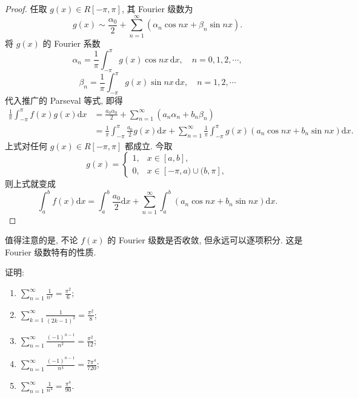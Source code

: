 \begin{proof}
任取 $g(x) \in R[-\pi, \pi]$, 其 Fourier 级数为
\[
  g(x)\sim\frac{\alpha_{0}}{2}+\sum_{n=1}^{\infty}\left(\alpha_{n}\cos nx+\beta_{n}\sin nx\right).
\]
将 $g(x)$ 的 Fourier 系数
\[
  \alpha_{n}=\frac{1}{\pi}\int_{-\pi}^{\pi}g(x)\cos nx \,\mathrm{d}x,\quad n=0,1,2,\cdots,
\]
\[
  \beta_{n}=\frac{1}{\pi}\int_{-\pi}^{\pi}g(x)\sin n x\,\mathrm{d}x,\quad n=1,2,\cdots
\]
代入推广的 Parseval 等式, 即得
\[
  \begin{aligned}
    \frac{1}{\pi}\int_{-\pi}^{\pi}f(x)g(x)\mathrm{d}x&=\frac{a_{0}\alpha_{0}}{2}+\sum_{n=1}^{\infty}(a_{n}\alpha_{n}+b_{n}\beta_{n})\\
    &=\frac{1}{\pi}\int_{-\pi}^{\pi}\frac{a_{0}}{2}g(x)\mathrm{d}x+\sum_{n=1}^{\infty}\frac{1}{\pi}\int_{-\pi}^{\pi}g(x)(a_{n}\cos nx+b_{n}\sin nx)\mathrm{d}x.
  \end{aligned}
\]
上式对任何 $g(x) \in R[-\pi, \pi]$ 都成立. 今取
\[
  g(x)=\begin{cases}
    1, & x\in[a,b],\\
    0, & x\in[-\pi,a)\cup(b,\pi],
\end{cases}
\]
则上式就变成
\[
  \int_{a}^{b}f(x)\mathrm{d}x=\int_{a}^{b}\frac{a_{0}}{2}\mathrm{d}x+\sum_{n=1}^{\infty}\int_{a}^{b}(a_{n}\cos nx+b_{n}\sin nx)\mathrm{d}x.
\]
\end{proof}

值得注意的是, 不论 $f(x)$ 的 Fourier 级数是否收敛, 但永远可以逐项积分. 这是 Fourier 级数特有的性质.

\begin{example}\label{ex:16.2.2}
证明:
\begin{enumerate}
  \item $\displaystyle\sum_{n=1}^{\infty} \frac{1}{n^{2}} = \frac{\pi^{2}}{6}$;
  \item $\displaystyle\sum_{k=1}^{\infty} \frac{1}{(2k-1)^{2}} = \frac{\pi^{2}}{8}$;
  \item $\displaystyle\sum_{n=1}^{\infty} \frac{(-1)^{n-1}}{n^{2}} = \frac{\pi^{2}}{12}$;
  \item $\displaystyle\sum_{n=1}^{\infty} \frac{(-1)^{n-1}}{n^{4}} = \frac{7\pi^{4}}{720}$;
  \item $\displaystyle\sum_{n=1}^{\infty} \frac{1}{n^{4}} = \frac{\pi^{4}}{90}$.
\end{enumerate}
\end{example}

